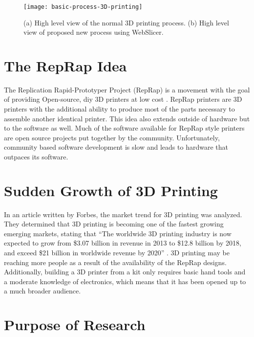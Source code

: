 \begin{figure}[!ht]
  \centering
  \texttt{[image: basic-process-3D-printing]}
  \caption{(a) High level view of the normal 3D printing process. (b) High level view of proposed new process using WebSlicer.}
\end{figure}


\section{The RepRap Idea}
\paragraph{}
The Replication Rapid-Prototyper Project (RepRap) is a movement with the goal of providing Open-source, diy 3D printers at low cost \citep{reprap-2011}.
RepRap printers are 3D printers with the additional ability to produce most of the parts necessary to assemble another identical printer.
This idea also extends outside of hardware but to the software as well.
Much of the software available for RepRap style printers are open source projects put together by the community.
Unfortunately, community based software development is slow and leads to hardware that outpaces its software.

\section{Sudden Growth of 3D Printing}
\paragraph{}
In an article written by Forbes, the market trend for 3D printing was analyzed.
They determined that 3D printing is becoming one of the fastest growing emerging markets, stating that
``The worldwide 3D printing industry is now expected to grow from \$3.07 billion in revenue in 2013 to \$12.8 billion by 2018, and exceed \$21 billion in worldwide revenue by 2020'' \citep{forbes3D}.
3D printing may be reaching more people as a result of the availability of the RepRap designs.
Additionally, building a 3D printer from a kit only requires basic hand tools and a moderate knowledge of electronics, which means that it has been opened up to a much broader audience.

\section{Purpose of Research}
